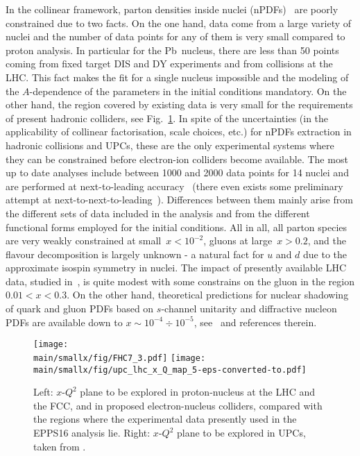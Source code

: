 \documentclass[../report.tex]{subfiles}
\providecommand{\main}{..}
\begin{document}
In the collinear framework, parton densities inside nuclei (nPDFs)~\cite{Paukkunen:2017bbm,armestodis2018} are poorly constrained due to two facts. 
On the one hand, data come from a large variety of nuclei and the number of data points for any of them is very small compared to proton analysis. In particular for the Pb~nucleus, there are less than 50 points coming from fixed target DIS and DY experiments and from \pPb collisions at the LHC. 
This fact makes the fit for a single nucleus impossible and the modeling of the $A$-dependence of the parameters in the initial conditions mandatory. On the other hand, the region covered by existing data is very small for the requirements of present hadronic colliders, see Fig.~\ref{fig:smallx1}. 
In spite of the uncertainties (in the applicability of collinear factorisation, scale choices, etc.) for nPDFs extraction in hadronic collisions and UPCs, these are the only experimental systems where they can be constrained before electron-ion colliders become available. 
The most up to date analyses include between 1000 and 2000 data points for 14 nuclei and are performed at next-to-leading accuracy~\cite{deFlorian:2011fp,Kovarik:2015cma,Eskola:2016oht} (there even exists some preliminary attempt at next-to-next-to-leading~\cite{Khanpour:2016pph}).
Differences between them mainly arise from the different sets of data included in the analysis and from the different functional forms employed for the initial conditions. 
All in all, all parton species are very weakly constrained at small~$x<10^{-2}$, gluons at large~$x>0.2$, and the flavour decomposition is largely unknown - a natural fact for $u$ and $d$ due to the approximate isospin symmetry in nuclei. 
The impact of presently available LHC data, studied in~\cite{Eskola:2016oht}, is quite modest with some constrains on the gluon in the region $0.01<x<0.3$. 
On the other hand,  theoretical predictions for nuclear shadowing of quark and gluon PDFs  based on $s$-channel unitarity and diffractive nucleon PDFs are available down to $x \sim 10^{-4} \div 10^{-5}$, see~\cite{Frankfurt:2011cs,Armesto:2003fi} and references therein. 

\begin{figure}[htb]
\centering
\texttt{[image: \\main/smallx/fig/FHC7\_3.pdf]} \hfill \texttt{[image: \\main/smallx/fig/upc\_lhc\_x\_Q\_map\_5-eps-converted-to.pdf]}
\caption{Left: $x$-$Q^2$ plane to be explored in proton-nucleus at the LHC and the FCC, and in  proposed electron-nucleus colliders, compared with the regions where the experimental data presently used in the EPPS16 analysis \cite{Eskola:2016oht} lie. Right: $x$-$Q^2$ plane to be explored in UPCs, taken from \cite{Baltz:2007kq}.}
\label{fig:smallx1}
\end{figure}
\end{document}
